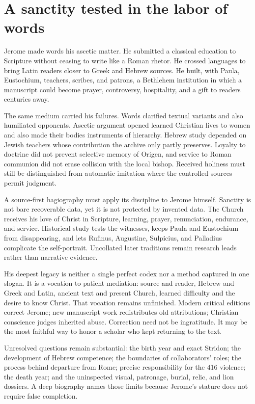 \section{A sanctity tested in the labor of words}\label{sec:jerome-synthesis}

Jerome made words his ascetic matter. He submitted a classical education to
Scripture without ceasing to write like a Roman rhetor. He crossed languages
to bring Latin readers closer to Greek and Hebrew sources. He built, with
Paula, Eustochium, teachers, scribes, and patrons, a Bethlehem institution in
which a manuscript could become prayer, controversy, hospitality, and a gift
to readers centuries away.

The same medium carried his failures. Words clarified textual variants and
also humiliated opponents. Ascetic argument opened learned Christian lives to
women and also made their bodies instruments of hierarchy. Hebrew study
depended on Jewish teachers whose contribution the archive only partly
preserves. Loyalty to doctrine did not prevent selective memory of Origen, and
service to Roman communion did not erase collision with the local bishop.
Received holiness must still be distinguished from automatic imitation where
the controlled sources permit judgment.

A source-first hagiography must apply its discipline to Jerome himself.
Sanctity is not bare recoverable data, yet it is not protected by invented
data. The Church receives his love of Christ in Scripture, learning, prayer,
renunciation, endurance, and service. Historical study tests the witnesses,
keeps Paula and Eustochium from disappearing, and lets Rufinus, Augustine,
Sulpicius, and Palladius complicate the self-portrait. Uncollated later
traditions remain research leads rather than narrative evidence.

His deepest legacy is neither a single perfect codex nor a method captured in
one slogan. It is a vocation to patient mediation: source and reader, Hebrew
and Greek and Latin, ancient text and present Church, learned difficulty and
the desire to know Christ. That vocation remains unfinished. Modern critical
editions correct Jerome; new manuscript work redistributes old attributions;
Christian conscience judges inherited abuse. Correction need not be ingratitude.
It may be the most faithful way to honor a scholar who kept returning to the
text.

Unresolved questions remain substantial: the birth year and exact Stridon;
the development of Hebrew competence; the boundaries of collaborators' roles;
the process behind departure from Rome; precise responsibility for the 416
violence; the death year; and the uninspected visual, patronage, burial, relic,
and lion dossiers. A deep biography names those limits because Jerome's
stature does not require false completion.
